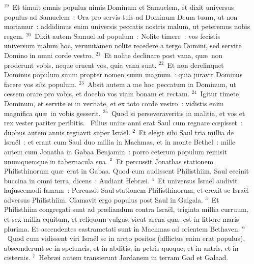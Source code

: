 ${}^{19}$~Et timuit omnis populus nimis Dominum et Samuelem, et dixit universus populus ad Samuelem~: Ora pro servis tuis ad Dominum Deum tuum, ut non moriamur~: addidimus enim universis peccatis nostris malum, ut peteremus nobis regem.
${}^{20}$~Dixit autem Samuel ad populum~: Nolite timere~: vos fecistis universum malum hoc, verumtamen nolite recedere a tergo Domini, sed servite Domino in omni corde vestro.
${}^{21}$~Et nolite declinare post vana, qu\ae\ non proderunt vobis, neque eruent vos, quia vana sunt.
${}^{22}$~Et non derelinquet Dominus populum suum propter nomen suum magnum~: quia juravit Dominus facere vos sibi populum.
${}^{23}$~Absit autem a me hoc peccatum in Dominum, ut cessem orare pro vobis, et docebo vos viam bonam et rectam.
${}^{24}$~Igitur timete Dominum, et servite ei in veritate, et ex toto corde vestro~: vidistis enim magnifica qu\ae\ in vobis gesserit.
${}^{25}$~Quod si perseveraveritis in malitia, et vos et rex vester pariter peribitis.
~\lettrine[lines=10,image=true,loversize=0.05,lraise=-0.03]{F}{}ilius unius anni erat Saul cum regnare cœpisset~: duobus autem annis regnavit super Isra\"el.
${}^{2}$~Et elegit sibi Saul tria millia de Isra\"el~: et erant cum Saul duo millia in Machmas, et in monte Bethel~: mille autem cum Jonatha in Gabaa Benjamin~: porro ceterum populum remisit unumquemque in tabernacula sua.
${}^{3}$~Et percussit Jonathas stationem Philisthinorum qu\ae\ erat in Gabaa. Quod cum audissent Philisthiim, Saul cecinit buccina in omni terra, dicens~: Audiant Hebr\ae i.
${}^{4}$~Et universus Isra\"el audivit hujuscemodi famam~: Percussit Saul stationem Philisthinorum, et erexit se Isra\"el adversus Philisthiim. Clamavit ergo populus post Saul in Galgala.
${}^{5}$~Et Philisthiim congregati sunt ad pr\ae liandum contra Isra\"el, triginta millia curruum, et sex millia equitum, et reliquum vulgus, sicut arena qu\ae\ est in littore maris plurima. Et ascendentes castrametati sunt in Machmas ad orientem Bethaven.
${}^{6}$~Quod cum vidissent viri Isra\"el se in arcto positos (afflictus enim erat populus), absconderunt se in speluncis, et in abditis, in petris quoque, et in antris, et in cisternis.
${}^{7}$~Hebr\ae i autem transierunt Jordanem in terram Gad et Galaad.

